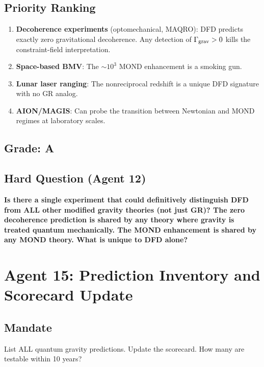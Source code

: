 \documentclass[11pt,a4paper]{article}
\begin{document}
\subsection{Priority Ranking}

\begin{enumerate}
\item \textbf{Decoherence experiments} (optomechanical, MAQRO): DFD predicts exactly zero gravitational decoherence. Any detection of $\Gamma_{\rm grav} > 0$ kills the constraint-field interpretation.
\item \textbf{Space-based BMV}: The $\sim 10^3$ MOND enhancement is a smoking gun.
\item \textbf{Lunar laser ranging}: The nonreciprocal redshift is a unique DFD signature with no GR analog.
\item \textbf{AION/MAGIS}: Can probe the transition between Newtonian and MOND regimes at laboratory scales.
\end{enumerate}

\subsection{Grade: A}

\subsection{Hard Question (Agent 12)}

\textbf{Is there a single experiment that could definitively distinguish DFD from ALL other modified gravity theories (not just GR)? The zero decoherence prediction is shared by any theory where gravity is treated quantum mechanically. The MOND enhancement is shared by any MOND theory. What is unique to DFD alone?}

\newpage

\section{Agent 15: Prediction Inventory and Scorecard Update}
\label{sec:agent15}

\subsection{Mandate}

List ALL quantum gravity predictions. Update the scorecard. How many are testable within 10 years?
\end{document}

